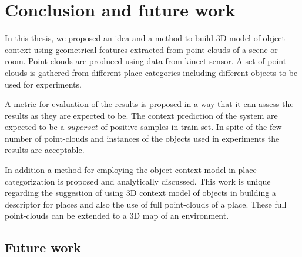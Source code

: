 \chapter{Conclusion and future work}
\label{Conclusion.ch}
In this thesis, we proposed an idea and a method to build 3D model of object context using geometrical features extracted
from point-clouds of a scene or room.
Point-clouds are produced using data from kinect sensor.
A set of point-clouds is gathered from different place categories including different objects to be used for experiments.

A metric for evaluation of the results is proposed in a way that it can assess the results as they are expected to be.
The context prediction of the system are expected to be a $superset$ of positive samples in train set.
In spite of the few number of point-clouds and instances of the objects used in experiments the results are acceptable. 

In addition a method for employing the object context model in place categorization is proposed and analytically discussed.
This work is unique regarding the suggestion of using 3D context model of objects in building a descriptor for places and also the use of full 
point-clouds of a place. 
These full point-clouds can be extended to a 3D map of an environment.

\section{Future work}

